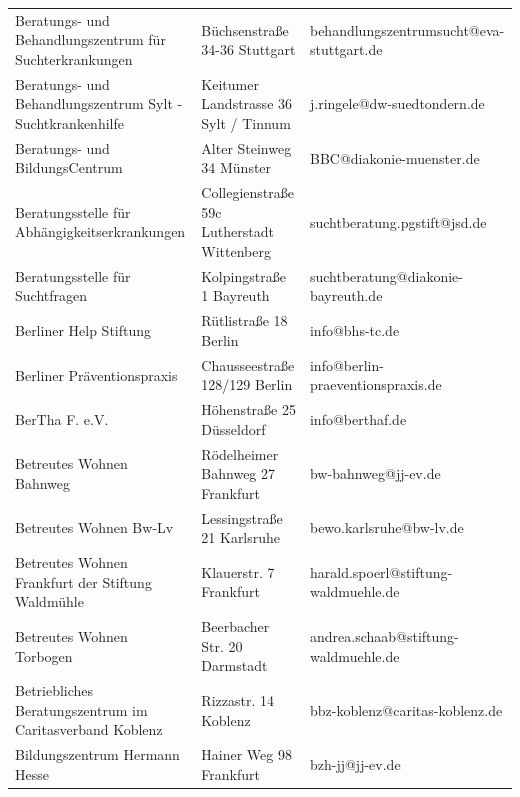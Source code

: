 {\begin{xltabular}{\textwidth} {
 >{\raggedright\arraybackslash}p{5cm}
 >{\raggedright\arraybackslash}X
 >{\raggedright\arraybackslash}p{5cm} }
Beratungs- und Behandlungszentrum für Suchterkrankungen & Büchsenstraße 34-36 Stuttgart & behandlungszentrumsucht@eva-stuttgart.de \\
Beratungs- und Behandlungszentrum Sylt - Suchtkrankenhilfe & Keitumer Landstrasse 36 Sylt / Tinnum & j.ringele@dw-suedtondern.de \\
Beratungs- und BildungsCentrum & Alter Steinweg 34 Münster & BBC@diakonie-muenster.de \\
Beratungsstelle für Abhängigkeitserkrankungen & Collegienstraße 59c Lutherstadt Wittenberg & suchtberatung.pgstift@jsd.de \\
Beratungsstelle für Suchtfragen & Kolpingstraße 1 Bayreuth & suchtberatung@diakonie-bayreuth.de \\
Berliner Help Stiftung & Rütlistraße 18 Berlin & info@bhs-tc.de \\
Berliner Präventionspraxis & Chausseestraße 128/129 Berlin & info@berlin-praeventionspraxis.de \\
BerTha F. e.V. & Höhenstraße 25 Düsseldorf & info@berthaf.de \\
Betreutes Wohnen Bahnweg & Rödelheimer Bahnweg 27 Frankfurt & bw-bahnweg@jj-ev.de \\
Betreutes Wohnen Bw-Lv & Lessingstraße 21 Karlsruhe & bewo.karlsruhe@bw-lv.de \\
Betreutes Wohnen Frankfurt der Stiftung Waldmühle & Klauerstr. 7 Frankfurt & harald.spoerl@stiftung-waldmuehle.de \\
Betreutes Wohnen Torbogen & Beerbacher Str. 20 Darmstadt & andrea.schaab@stiftung-waldmuehle.de \\
Betriebliches Beratungszentrum im Caritasverband Koblenz & Rizzastr. 14 Koblenz & bbz-koblenz@caritas-koblenz.de \\
Bildungszentrum Hermann Hesse & Hainer Weg 98 Frankfurt & bzh-jj@jj-ev.de \\

\end{xltabular}}
